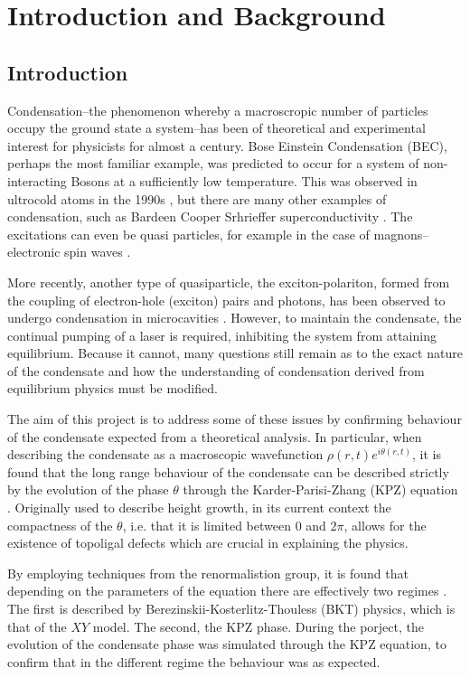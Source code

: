 \chapter{Introduction and Background}

\section{Introduction}

Condensation--the phenomenon whereby a macroscropic number of particles occupy the ground state a system--has been of theoretical and experimental interest for physicists for almost a century. Bose Einstein Condensation (BEC), perhaps the most familiar example, was predicted to occur for a system of non-interacting Bosons at a sufficiently low temperature. This was observed in ultrocold atoms in the 1990s \cite{PhysRevLett.75.3969}, but there are many other examples of condensation, such as Bardeen Cooper Srhrieffer superconductivity \cite{PhysRev.108.1175}. The excitations can even be quasi particles, for example in the case of magnons--electronic spin waves \cite{magnon}.

More recently, another type of quasiparticle, the exciton-polariton, formed from the coupling of electron-hole (exciton) pairs and photons, has been observed to undergo condensation in microcavities \cite{Byrnes2014}. However, to maintain the condensate, the continual pumping of a laser is required, inhibiting the system from attaining equilibrium. Because it cannot, many questions still remain as to the exact nature of the condensate and how the understanding of condensation derived from equilibrium physics must be modified. 

The aim of this project is to address some of these issues by confirming behaviour of the condensate expected from a theoretical analysis. In particular, when describing the condensate as a macroscopic wavefunction $\rho(r,t)e^{i\theta(r,t)}$, it is found that the long range behaviour of the condensate can be described strictly by the evolution of the phase $\theta$ through the Karder-Parisi-Zhang (KPZ) equation \cite{PhysRevX.7.041006,2015PhRvX...5a1017A}. Originally used to describe height growth\cite{PhysRevLett.56.889}, in its current context the compactness of the $\theta$, i.e. that it is limited between $0$ and $2\pi$, allows for the existence of topoligal defects which are crucial in explaining the physics.

By employing techniques from the renormalistion group, it is found that depending on the parameters of the equation there are effectively two regimes \cite{PhysRevX.7.041006,2015PhRvX...5a1017A}. The first is described by Berezinskii-Kosterlitz-Thouless (BKT) physics, which is that of the $XY$ model. The second, the KPZ phase. 
During the porject, the evolution of the condensate phase was simulated through the KPZ equation, to confirm that in the different regime the behaviour was as expected. 


